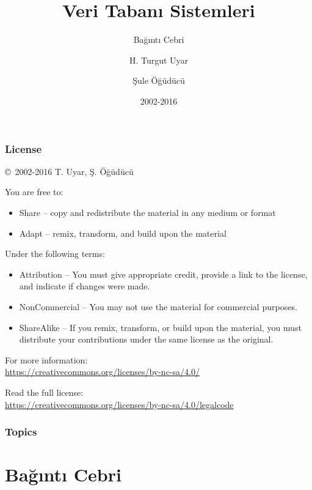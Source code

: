 \documentclass[dvipsnames]{beamer}
\title{Veri Tabanı Sistemleri}
\subtitle{Bağıntı Cebri}
\author{H. Turgut Uyar \and Şule Öğüdücü}
\date{2002-2016}
\theoremstyle{plain}
\begin{document}
\begin{frame}
  \titlepage
\end{frame}

\begin{frame}
  \frametitle{License}

  \hfill
  \copyright~2002-2016 T. Uyar, Ş. Öğüdücü

  \vfill
  \begin{footnotesize}
    You are free to:
    \begin{itemize}
      \itemsep0em
      \item Share -- copy and redistribute the material in any medium or format
      \item Adapt -- remix, transform, and build upon the material
    \end{itemize}

    Under the following terms:
    \begin{itemize}
      \itemsep0em
      \item Attribution -- You must give appropriate credit, provide a link to
        the license, and indicate if changes were made.

      \item NonCommercial -- You may not use the material for commercial
        purposes.

      \item ShareAlike -- If you remix, transform, or build upon the material,
        you must distribute your contributions under the same license as the
        original.
    \end{itemize}
  \end{footnotesize}

  \begin{small}
    For more information:\\
    \url{https://creativecommons.org/licenses/by-nc-sa/4.0/}

    \smallskip
    Read the full license:\\
    \url{https://creativecommons.org/licenses/by-nc-sa/4.0/legalcode}
  \end{small}
\end{frame}

\begin{frame}
  \frametitle{Topics}
  \tableofcontents
\end{frame}

\lstset{language=TutorialD}

\section{Bağıntı Cebri}
\end{document}
